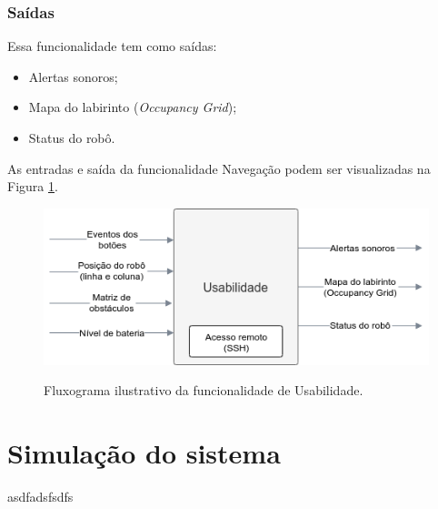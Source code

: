 \subsubsection{Saídas}
Essa funcionalidade tem como saídas:
\begin{itemize}
	\item Alertas sonoros;
	\item Mapa do labirinto (\textit{Occupancy Grid});
	\item Status do robô.
\end{itemize}

As entradas e saída da funcionalidade Navegação podem ser visualizadas na Figura \ref{fig:especificacao_funcional_usabilidade}.

\begin{figure}[H]
	\centering
	\caption{Fluxograma ilustrativo da funcionalidade de Usabilidade.}
	\includegraphics[width=1\textwidth]
	{Figures/especificacao_funcional_usabilidade}
	\label{fig:especificacao_funcional_usabilidade}
\end{figure}


\section{Simulação do sistema}
\label{sec:sim}
asdfadsfsdfs

